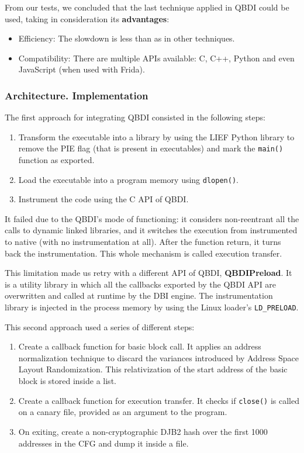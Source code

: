 \documentclass[12pt,a4paper,english,onecolumn]{IEEEtran}
\begin{document}
From our tests, we concluded that the last technique applied in QBDI could be used, taking in consideration its \textbf{advantages}:
\begin{itemize}
    \item Efficiency: The slowdown is less than as in other techniques.
    \item Compatibility: There are multiple APIs available: C, C++, Python and even JavaScript (when used with Frida).
\end{itemize}

\subsubsection{Architecture. Implementation}

The first approach for integrating QBDI consisted in the following steps:
\begin{enumerate}
    \item Transform the executable into a library by using the LIEF \cite{lief} Python library to remove the PIE flag (that is present in executables) and mark the \texttt{main()} function as exported.
    \item  Load the executable into a program memory using \texttt{dlopen()}.
    \item  Instrument the code using the C API of QBDI.
\end{enumerate}

It failed due to the QBDI's mode of functioning: it considers non-reentrant all the calls to dynamic linked libraries, and it switches the execution from instrumented to native (with no instrumentation at all). After the function return, it turns back the instrumentation. This whole mechanism is called execution transfer.

This limitation made us retry with a different API of QBDI, \textbf{QBDIPreload}. It is a utility library in which all the callbacks exported by the QBDI API are overwritten and called at runtime by the DBI engine. The instrumentation library is injected in the process memory by using the Linux loader's \texttt{LD_PRELOAD}.

This second approach used a series of different steps:
\begin{enumerate}
    \item Create a callback function for basic block call. It applies an address normalization technique to discard the variances introduced by Address Space Layout Randomization. This relativization of the start address of the basic block is stored inside a list.
    \item  Create a callback function for execution transfer. It checks if \texttt{close()} is called on a canary file, provided as an argument to the program.
    \item  On exiting, create a non-cryptographic DJB2 hash over the first 1000 addresses in the CFG and dump it inside a file.
\end{enumerate}
\end{document}
